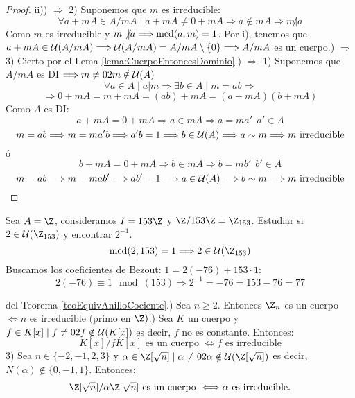 \begin{teo}
\begin{proof}
    ii)) $\Longrightarrow$ 2) Suponemos que $m$ es irreducible:
    $$\forall a+mA \in A/mA \mid a+mA \neq 0+mA \Longrightarrow a\notin mA \Longrightarrow m\not|a$$
    Como $m$ es irreducible y $m\not|a \Longrightarrow \operatorname{mcd}(a,m)=1$.\newline
    Por i), tenemos que $a+mA \in \mathcal{U}(A/mA) \Longrightarrow \mathcal{U}(A/mA) = A/mA \setminus\{0\} \Longrightarrow A/mA$ es un cuerpo.) $\Longrightarrow$ 3) Cierto por el Lema \ref{lema:CuerpoEntoncesDominio}.) $\Longrightarrow$ 1) Suponemos que $A/mA$ es DI $\Longrightarrow m\neq 0 2 m\notin \mathcal{U}(A)$
    $$\forall a \in A \mid a|m \Longrightarrow \exists b \in A \mid m=ab \Longrightarrow $$
    $$\Longrightarrow 0+mA = m+mA = (ab)+mA = (a+mA)(b+mA)$$
    Como $A$ es DI:
    $$a+mA = 0+mA \Longrightarrow a\in mA \Longrightarrow a=ma'~~a' \in A$$
    $$m=ab \Longrightarrow m=ma'b \Longrightarrow a'b=1 \Longrightarrow b\in \mathcal{U}(A) \Longrightarrow a\sim m \Longrightarrow m \mbox{ irreducible}$$
    ó
    $$b+mA = 0+mA \Longrightarrow b\in mA \Longrightarrow b=mb'~~b'\in A$$
    $$m=ab \Longrightarrow m=mab' \Longrightarrow ab'=1 \Longrightarrow a\in \mathcal{U}(A) \Longrightarrow b\sim m \Longrightarrow m \mbox{ irreducible}$$
\end{proof}
\end{teo}

\begin{ejemplo}
    Sea $A=\Z$, consideramos $I=153\Z$ y $\Z/153\Z=\Z_{153}$.\newline
    Estudiar si $2 \in \cc{U}(\Z_{153})$ y encontrar $2^{-1}$.\\

    
    $$\mcd(2,153)=1 \Longrightarrow 2 \in \cc{U}(\Z_{153})$$
    Buscamos los coeficientes de Bezout: $1=2(-76)+153\cdot 1$:
    $$2(-76)\equiv 1\mod(153) \Longrightarrow 2^{-1} = -76 = 153-76 = 77$$
\end{ejemplo}

\begin{coro}
    del Teorema \ref{teoEquivAnilloCociente}.) Sea $n\geq 2$. Entonces $\Z_n$ es un cuerpo $\Longleftrightarrow n$ es irreducible $($primo en $\Z)$.) Sea $K$ un cuerpo y $f \in K[x] \mid f\neq 0 2 f\notin \mathcal{U}(K[x])$ es decir, $f$ no es constante. Entonces:
    $$K[x]/fK[x] \mbox{ es un cuerpo } \Longleftrightarrow f \mbox{ es irreducible}$$
    3) Sea $n\in \{-2, -1, 2, 3\}$ y $\alpha \in \Z[\sqrt{n}] \mid \alpha \neq 0 \y \alpha \notin \cc{U}(\Z[\sqrt{n}])$ es decir,
    $N(\alpha) \notin \{0, -1, 1\}$. Entonces:
    $$\Z[\sqrt{n}]/\alpha \Z[\sqrt{n}] \mbox{ es un cuerpo } \Longleftrightarrow \alpha \mbox{ es irreducible.}$$
\end{coro}~\\

